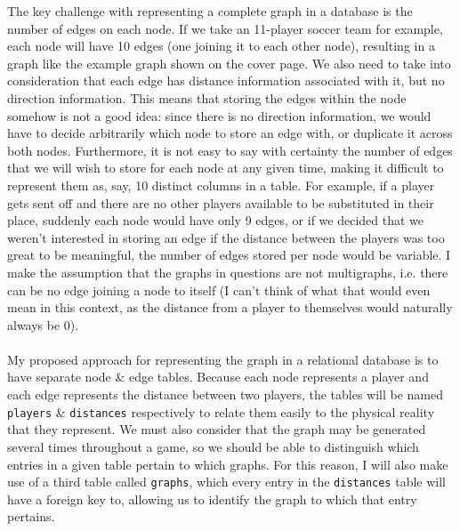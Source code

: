 \documentclass[a4paper,11pt]{article}
\begin{document}
The key challenge with representing a complete graph in a database is the number of edges on each node. 
If we take an 11-player soccer team for example, each node will have 10 edges (one joining it to each other node), resulting in a graph like the example 
graph shown on the cover page.
We also need to take into consideration that each edge has distance information associated with it, but no direction 
information.
This means that storing the edges within the node somehow is not a good idea:
since there is no direction information, we would have to decide arbitrarily which node to store an edge with, or duplicate it across both nodes. 
Furthermore, it is not easy to say with certainty the number of edges that we will wish to store for each node at any given time, making it difficult to represent them as, say, 10 distinct columns in a 
table. 
For example, if a player gets sent off and there are no other players available to be substituted in their place, suddenly each node would have only 9 edges, or if we decided that we weren't interested in
storing an edge if the distance between the players was too great to be meaningful, the number of edges stored per node would be variable.
I make the assumption that the graphs in questions are not multigraphs, i.e. there can be no edge joining a node to itself (I can't think of what that would even 
mean in this context, as the distance from a player to themselves would naturally always be 0).
\\\\
My proposed approach for representing the graph in a relational database is to have separate node \& edge tables.
Because each node represents a player and each edge represents the distance between two players, the tables will be named 
\texttt{players} \& \texttt{distances} respectively to relate them easily to the physical reality that they represent.
We must also consider that the graph may be generated several times throughout a game, so we should be able to distinguish which entries in a given table pertain to which graphs. 
For this reason, I will also make use of a third table called \texttt{graphs}, which every entry in the \texttt{distances} table will have a foreign key to, allowing us to identify the
graph to which that entry pertains. 
\end{document}
